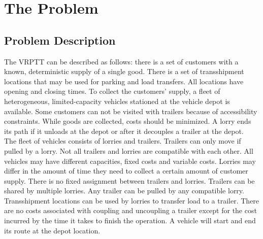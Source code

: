 \section{The Problem}
\label{chap:The Problem}

 \subsection{Problem Description}


The VRPTT can be described as follows:
there is a set of customers with a known, deterministic supply of a single good.
There is a set of transshipment locations that may be used for parking and load transfers.
All locations have opening and closing times.
To collect the customers' supply, a fleet of heterogeneous, limited-capacity vehicles stationed at the vehicle depot is available.
Some customers can not be visited with trailers because of accessibility constraints.
While goods are collected, costs should be minimized.
A lorry ends its path if it unloads at the depot or after it decouples a trailer at the depot. \\

The fleet of vehicles consists of lorries and trailers.
Trailers can only move if pulled by a lorry.
Not all trailers and lorries are compatible with each other.
All vehicles may have different capacities, fixed costs and variable costs.
Lorries may differ in the amount of time they need to collect a certain amount of customer supply.  There is no fixed assignment between trailers and lorries.
Trailers can be shared by multiple lorries.
Any trailer can be pulled by any compatible lorry. \\

Transshipment locations can be used by lorries to transfer load to a trailer.
There are no costs associated with coupling and uncoupling a trailer except for the cost incurred by the time it takes to finish the operation.
A vehicle will start and end its route at the depot location.

